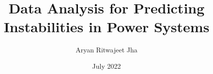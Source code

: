 \documentclass[MS,synopsis]{iitddiss}
\title{Data Analysis for Predicting Instabilities in Power Systems}
\author{Aryan Ritwajeet Jha}
\date{July 2022}
\begin{document}
\maketitle



\newpage

\renewcommand{\contentsname}{Proposed Contents of the Thesis}

\setcounter{page}{0}

\tableofcontents

\newpage
{}

















\printbibliography
\end{document}
